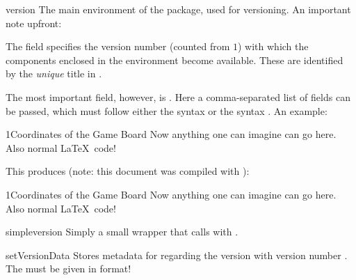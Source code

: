 \documentclass{sopra-base}
\begin{document}
\begin{environment}{version}{}
    The main environment of the package, used for versioning. An important note upfront: \par{}
    The field  specifies the version number (counted from \(1\)) with which the components enclosed in the environment become available. These are identified by the \emph{unique} title in .\par{}
    The most important field, however, is . Here a comma-separated list of fields can be passed, which must follow either the syntax  or the syntax . An example:
\begin{latex}
\begin{version}{1}{Coordinates of the Game Board}
    Now anything one can imagine can go here. Also normal \LaTeX\ code!
\end{version}
\end{latex}
    This produces (note: this document was compiled with ):\\
\begin{version}{1}{Coordinates of the Game Board}
Now anything one can imagine can go here. Also normal \LaTeX\ code!
\end{version}
\end{environment}

\begin{command}{simpleversion}{}
    Simply a small wrapper that calls  with .
\end{command}

\begin{command}{setVersionData}{}
    Stores metadata for  regarding the version with version number . The  must be given in  format!
\end{command}
\end{document}
